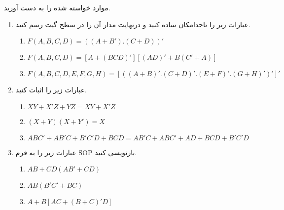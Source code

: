 موارد خواسته شده را به دست آورید.

\begin{enumerate}
	\item 
	عبارات زیر را تاحدامکان ساده کنید و درنهایت مدار آن را در سطح گیت رسم کنید.
	
	\begin{latin}
		\begin{enumerate}
			\item $F(A, B, C, D) = ((A + B').(C + D))'$
			
			\item $F(A,B,C,D) = [A + (BCD)' ][ (AD)' + B(C' + A) ]$
			
			\item $F(A,B,C,D,E,F,G,H) = [ ((A + B)' . (C + D)' . (E + F)' . (G + H)' )' ]'$
		\end{enumerate}
	\end{latin}
	
	
	\item	
	عبارات زیر را اثبات کنید.
	\begin{latin}
		\begin{enumerate}
			
			\item $XY + X' Z + YZ = XY + X' Z$
			
			\item $(X + Y) (X + Y') = X$
			
			\item $ABC′ + AB'C + B'C'D + BCD = AB'C + ABC' + AD + BCD + B'C'D$
		\end{enumerate}
	\end{latin}
	
	
	\item 
	عبارات زیر را به فرم SOP بازنویسی کنید.
	\begin{latin}
		\begin{enumerate}
			\item $AB + CD (AB' + CD)$
			
			\item $AB (B' C' + BC)$
			
			\item $A + B[AC + (B + C)' D]$
		\end{enumerate}
	\end{latin}
	
	
	
	
\end{enumerate}
